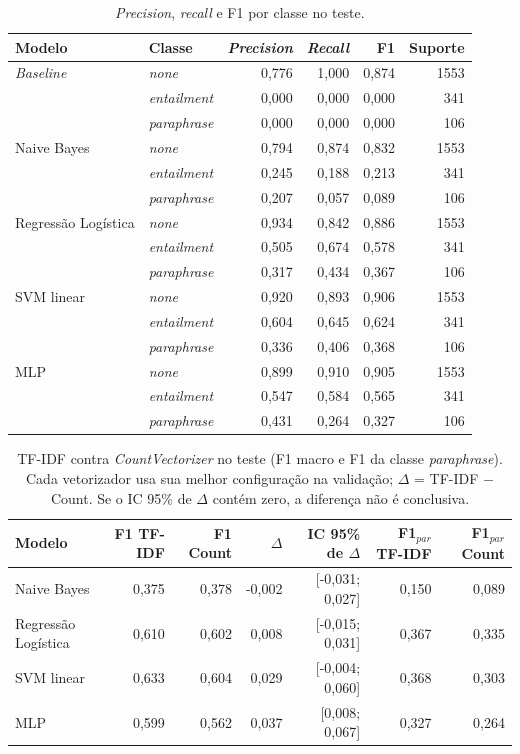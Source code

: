 \begin{table}[htbp]
\centering
\small
\begin{tabular}{llrrrr}
\toprule
Modelo & Classe & \textit{Precision} & \textit{Recall} & F1 & Suporte \\
\midrule
\textit{Baseline} & \textit{none} & 0,776 & 1,000 & 0,874 & 1553 \\
 & \textit{entailment} & 0,000 & 0,000 & 0,000 & 341 \\
 & \textit{paraphrase} & 0,000 & 0,000 & 0,000 & 106 \\
\midrule
Naive Bayes & \textit{none} & 0,794 & 0,874 & 0,832 & 1553 \\
 & \textit{entailment} & 0,245 & 0,188 & 0,213 & 341 \\
 & \textit{paraphrase} & 0,207 & 0,057 & 0,089 & 106 \\
\midrule
Regressão Logística & \textit{none} & 0,934 & 0,842 & 0,886 & 1553 \\
 & \textit{entailment} & 0,505 & 0,674 & 0,578 & 341 \\
 & \textit{paraphrase} & 0,317 & 0,434 & 0,367 & 106 \\
\midrule
SVM linear & \textit{none} & 0,920 & 0,893 & 0,906 & 1553 \\
 & \textit{entailment} & 0,604 & 0,645 & 0,624 & 341 \\
 & \textit{paraphrase} & 0,336 & 0,406 & 0,368 & 106 \\
\midrule
MLP & \textit{none} & 0,899 & 0,910 & 0,905 & 1553 \\
 & \textit{entailment} & 0,547 & 0,584 & 0,565 & 341 \\
 & \textit{paraphrase} & 0,431 & 0,264 & 0,327 & 106 \\
\bottomrule
\end{tabular}
\caption{\textit{Precision}, \textit{recall} e F1 por classe no teste.}
\label{tab:q4classes}
\end{table}

\begin{table}[htbp]
\centering
\small
\begin{tabular}{lrrrrrr}
\toprule
Modelo & F1 TF-IDF & F1 Count & $\Delta$ & IC 95\% de $\Delta$ & F1$_{par}$ TF-IDF & F1$_{par}$ Count \\
\midrule
Naive Bayes & 0,375 & 0,378 & -0,002 & [-0,031; 0,027] & 0,150 & 0,089 \\
Regressão Logística & 0,610 & 0,602 & 0,008 & [-0,015; 0,031] & 0,367 & 0,335 \\
SVM linear & 0,633 & 0,604 & 0,029 & [-0,004; 0,060] & 0,368 & 0,303 \\
MLP & 0,599 & 0,562 & 0,037 & [0,008; 0,067] & 0,327 & 0,264 \\
\bottomrule
\end{tabular}
\caption{TF-IDF contra \textit{CountVectorizer} no teste (F1 macro e F1 da classe \textit{paraphrase}). Cada vetorizador usa sua melhor configuração na validação; $\Delta$ = TF-IDF $-$ Count. Se o IC 95\% de $\Delta$ contém zero, a diferença não é conclusiva.}
\label{tab:q4vetorizadores}
\end{table}

